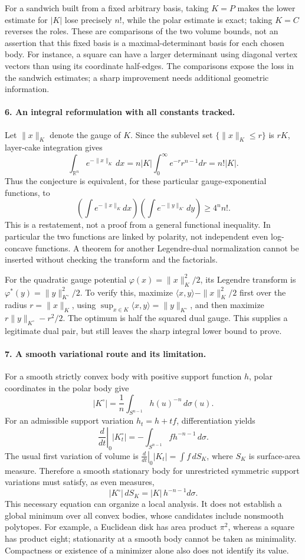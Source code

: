 \documentclass[11pt]{article}
\begin{document}
For a sandwich built from a fixed arbitrary basis, taking $K=P$ makes the lower estimate for $|K|$ lose precisely $n!$, while the polar estimate is exact; taking $K=C$ reverses the roles. These are comparisons of the two volume bounds, not an assertion that this fixed basis is a maximal-determinant basis for each chosen body. For instance, a square can have a larger determinant using diagonal vertex vectors than using its coordinate half-edges. The comparisons expose the loss in the sandwich estimates; a sharp improvement needs additional geometric information.

\paragraph{6. An integral reformulation with all constants tracked.}
Let $\|x\|_K$ denote the gauge of $K$. Since the sublevel set $\{\|x\|_K\leq r\}$ is $rK$, layer-cake integration gives
\[
 \int_{\mathbb R^n}e^{-\|x\|_K}\,dx
 =n|K|\int_0^\infty e^{-r}r^{n-1}dr=n!|K|.
\]
Thus the conjecture is equivalent, for these particular gauge-exponential functions, to
\[
 \left(\int e^{-\|x\|_K}dx\right)
 \left(\int e^{-\|y\|_{K^\circ}}dy\right)\geq4^n n!.
\]
This is a restatement, not a proof from a general functional inequality. In particular the two functions are linked by polarity, not independent even log-concave functions. A theorem for another Legendre-dual normalization cannot be inserted without checking the transform and the factorials.

For the quadratic gauge potential $\varphi(x)=\|x\|_K^2/2$, its Legendre transform is $\varphi^*(y)=\|y\|_{K^\circ}^2/2$. To verify this, maximize $\langle x,y\rangle-\|x\|_K^2/2$ first over the radius $r=\|x\|_K$, using $\sup_{x\in K}\langle x,y\rangle=\|y\|_{K^\circ}$, and then maximize $r\|y\|_{K^\circ}-r^2/2$. The optimum is half the squared dual gauge. This supplies a legitimate dual pair, but still leaves the sharp integral lower bound to prove.

\paragraph{7. A smooth variational route and its limitation.}
For a smooth strictly convex body with positive support function $h$, polar coordinates in the polar body give
\[
 |K^\circ|=\frac1n\int_{S^{n-1}}h(u)^{-n}\,d\sigma(u).
\]
For an admissible support variation $h_t=h+tf$, differentiation yields
\[
 \left.\frac d{dt}\right|_0|K_t^\circ|
 =-\int_{S^{n-1}}f h^{-n-1}\,d\sigma.
\]
The usual first variation of volume is $\left.\frac d{dt}\right|_0|K_t|=\int f\,dS_K$, where $S_K$ is surface-area measure. Therefore a smooth stationary body for unrestricted symmetric support variations must satisfy, as even measures,
\[
 |K^\circ|\,dS_K=|K|\,h^{-n-1}d\sigma.
\]
This necessary equation can organize a local analysis. It does not establish a global minimum over all convex bodies, whose candidates include nonsmooth polytopes. For example, a Euclidean disk has area product $\pi^2$, whereas a square has product eight; stationarity at a smooth body cannot be taken as minimality. Compactness or existence of a minimizer alone also does not identify its value.
\end{document}

